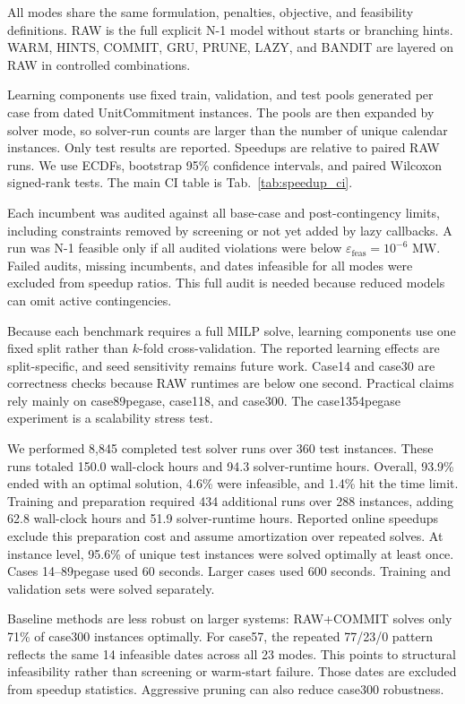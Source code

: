 \documentclass[runningheads]{llncs}
\begin{document}
All modes share the same formulation, penalties, objective, and feasibility definitions. RAW is the full explicit N-1 model without starts or branching hints. WARM, HINTS, COMMIT, GRU, PRUNE, LAZY, and BANDIT are layered on RAW in controlled combinations.

Learning components use fixed train, validation, and test pools generated per case from dated UnitCommitment instances. The pools are then expanded by solver mode, so solver-run counts are larger than the number of unique calendar instances. Only test results are reported. Speedups are relative to paired RAW runs. We use ECDFs, bootstrap 95\% confidence intervals, and paired Wilcoxon signed-rank tests. The main CI table is Tab.~\ref{tab:speedup_ci}.

Each incumbent was audited against all base-case and post-contingency limits, including constraints removed by screening or not yet added by lazy callbacks. A run was N-1 feasible only if all audited violations were below $\varepsilon_{\mathrm{feas}}=10^{-6}$ MW. Failed audits, missing incumbents, and dates infeasible for all modes were excluded from speedup ratios. This full audit is needed because reduced models can omit active contingencies.

Because each benchmark requires a full MILP solve, learning components use one fixed split rather than $k$-fold cross-validation. The reported learning effects are split-specific, and seed sensitivity remains future work. Case14 and case30 are correctness checks because RAW runtimes are below one second. Practical claims rely mainly on case89pegase, case118, and case300. The case1354pegase experiment is a scalability stress test.


We performed 8,845 completed test solver runs over 360 test instances. These runs totaled 150.0 wall-clock hours and 94.3 solver-runtime hours. Overall, 93.9\% ended with an optimal solution, 4.6\% were infeasible, and 1.4\% hit the time limit. Training and preparation required 434 additional runs over 288 instances, adding 62.8 wall-clock hours and 51.9 solver-runtime hours. Reported online speedups exclude this preparation cost and assume amortization over repeated solves. At instance level, 95.6\% of unique test instances were solved optimally at least once. Cases 14--89pegase used 60 seconds. Larger cases used 600 seconds. Training and validation sets were solved separately.

Baseline methods are less robust on larger systems: RAW+COMMIT solves only 71\% of case300 instances optimally. For case57, the repeated 77/23/0 pattern reflects the same 14 infeasible dates across all 23 modes. This points to structural infeasibility rather than screening or warm-start failure. Those dates are excluded from speedup statistics. Aggressive pruning can also reduce case300 robustness.
\end{document}
